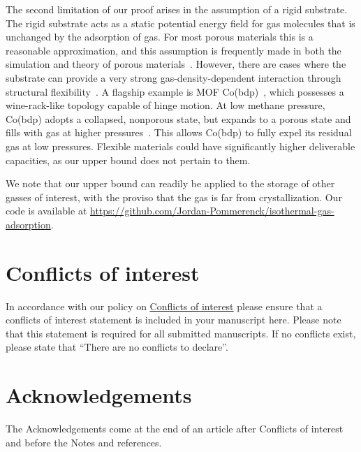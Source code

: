 \documentclass[twoside,twocolumn,9pt]{article}
\renewcommand{\refname}{Notes and references}
\begin{document}
The second limitation of our proof arises in the assumption of a rigid
substrate. The rigid substrate acts as a static potential energy field for gas
molecules that is unchanged by the adsorption of gas. For most porous materials
this is a reasonable approximation, and this assumption is frequently made in
both the simulation and theory of porous materials~\cite{duren2009using}.
However, there are cases where the substrate can provide a very strong
gas-density-dependent interaction through structural
flexibility~\cite{schneemann2014flexible}. A flagship example is MOF
Co(bdp)~\cite{choi2008broadly}, which possesses a wine-rack-like topology
capable of hinge motion. At low methane pressure, Co(bdp) adopts a collapsed,
nonporous state, but expands to a porous state and fills with gas at higher
pressures~\cite{mason2015methane}. This allows Co(bdp) to fully expel its
residual gas at low pressures. Flexible materials could have significantly 
higher deliverable capacities, as our upper bound does not pertain to them.

We note that our upper bound can readily be applied to the storage of other
gasses of interest, with the proviso that the gas is far from crystallization.
Our code is available at \href{https://github.com/Jordan-Pommerenck/isothermal-gas-adsorption}{https://github.com/Jordan-Pommerenck/isothermal-gas-adsorption}.

\section*{Conflicts of interest}
In accordance with our policy on \href{http://www.rsc.org/journals-books-databases/journal-authors-reviewers/author-responsibilities/#code-of-conduct}{Conflicts of interest} please ensure that a conflicts of interest statement is included in your manuscript here.  Please note that this statement is required for all submitted manuscripts.  If no conflicts exist, please state that ``There are no conflicts to declare''.

\section*{Acknowledgements}
The Acknowledgements come at the end of an article after Conflicts of interest and before the Notes and references.



\balance


\end{document}
